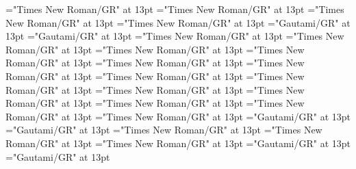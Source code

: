 \documentclass[a4paper]{article}
\begin{document}
\font\spanenCmPossibilitypublishStemTransTypeAbbreviationPubenCmTranslationpublishStemTypeConfigtranslationsexamplessensesensesentryletDatadicBody="Times New Roman/GR" at 13pt
\font\CmPossibilitypublishStemTransTypeNamePubenCmTranslationpublishStemTypeConfigtranslationsexamplessensesensesentryletDatadicBody="Times New Roman/GR" at 13pt
\font\spanenCmPossibilitypublishStemTransTypeNamePubenCmTranslationpublishStemTypeConfigtranslationsexamplessensesensesentryletDatadicBody="Times New Roman/GR" at 13pt
\font\spanenCmTranslationpublishStemTypeConfigtranslationsexamplessensesensesentryletDatadicBody="Times New Roman/GR" at 13pt
\font\translationLdtetranslationsexamplessensesensesentryletDatadicBody="Gautami/GR" at 13pt
\font\spantetranslationLdtetranslationsexamplessensesensesentryletDatadicBody="Gautami/GR" at 13pt
\font\spanentranslationLdtetranslationsexamplessensesensesentryletDatadicBody="Times New Roman/GR" at 13pt
\font\spanenexamplessensesensesentryletDatadicBody="Times New Roman/GR" at 13pt
\font\semanticdomainssensesensesentryletDatadicBody="Times New Roman/GR" at 13pt
\font\spanensemanticdomainssensesensesentryletDatadicBody="Times New Roman/GR" at 13pt
\font\semanticdomainabbrensemanticdomainssensesensesentryletDatadicBody="Times New Roman/GR" at 13pt
\font\spanensemanticdomainabbrensemanticdomainssensesensesentryletDatadicBody="Times New Roman/GR" at 13pt
\font\semanticdomainnameensemanticdomainssensesensesentryletDatadicBody="Times New Roman/GR" at 13pt
\font\spanensemanticdomainnameensemanticdomainssensesensesentryletDatadicBody="Times New Roman/GR" at 13pt
\font\spanensensesentryletDatadicBody="Times New Roman/GR" at 13pt
\font{}="Times New Roman/GR" at 13pt
\font\xitemendefinitionLdensensesensesentryletDatadicBody="Times New Roman/GR" at 13pt
\font\spanenxitemendefinitionLdensensesensesentryletDatadicBody="Times New Roman/GR" at 13pt
\font\spanendefinitionLdensensesensesentryletDatadicBody="Times New Roman/GR" at 13pt
\font\xitemtedefinitionLdensensesensesentryletDatadicBody="Gautami/GR" at 13pt
\font\spantexitemtedefinitionLdensensesensesentryletDatadicBody="Gautami/GR" at 13pt
\font\LexSensepublishStemGlossPubLdensensesensesentryletDatadicBody="Times New Roman/GR" at 13pt
\font\xitemenLexSensepublishStemGlossPubLdensensesensesentryletDatadicBody="Times New Roman/GR" at 13pt
\font\spanenxitemenLexSensepublishStemGlossPubLdensensesensesentryletDatadicBody="Times New Roman/GR" at 13pt
\font\xitemteLexSensepublishStemGlossPubLdensensesensesentryletDatadicBody="Gautami/GR" at 13pt
\font\spantexitemteLexSensepublishStemGlossPubLdensensesensesentryletDatadicBody="Gautami/GR" at 13pt
\end{document}
